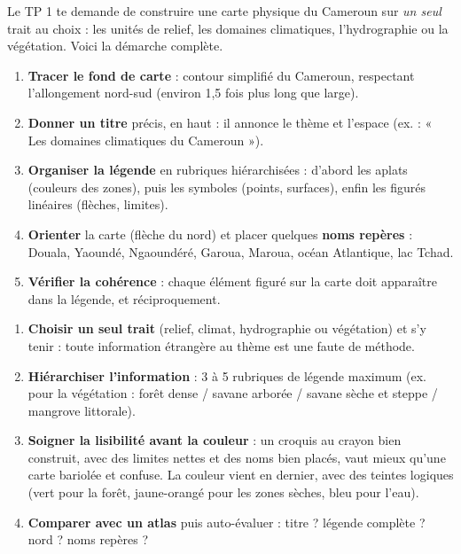 \documentclass[11pt]{article}
\newcommand{\cle}[1]{{\popxbold\color{popdark}#1}}
\begin{document}
Le TP 1 te demande de construire une carte physique du Cameroun sur \emph{un seul} trait au choix : les unités de relief, les domaines climatiques, l'hydrographie ou la végétation. Voici la démarche complète.

\begin{methode}
\begin{enumerate}
\item \textbf{Tracer le fond de carte} : contour simplifié du Cameroun, respectant l'allongement nord-sud (environ 1,5 fois plus long que large).
\item \textbf{Donner un titre} précis, en haut : il annonce le thème et l'espace (ex. : « Les domaines climatiques du Cameroun »).
\item \textbf{Organiser la légende} en rubriques hiérarchisées : d'abord les \cle{aplats} (couleurs des zones), puis les \cle{symboles} (points, surfaces), enfin les \cle{figurés} linéaires (flèches, limites).
\item \textbf{Orienter} la carte (flèche du nord) et placer quelques \textbf{noms repères} : Douala, Yaoundé, Ngaoundéré, Garoua, Maroua, océan Atlantique, lac Tchad.
\item \textbf{Vérifier la cohérence} : chaque élément figuré sur la carte doit apparaître dans la légende, et réciproquement.
\end{enumerate}
\end{methode}

\begin{methode}
\begin{enumerate}
\item \textbf{Choisir un seul trait} (relief, climat, hydrographie ou végétation) et s'y tenir : toute information étrangère au thème est une faute de méthode.
\item \textbf{Hiérarchiser l'information} : 3 à 5 rubriques de légende maximum (ex. pour la végétation : forêt dense / savane arborée / savane sèche et steppe / mangrove littorale).
\item \textbf{Soigner la lisibilité avant la couleur} : un croquis au crayon bien construit, avec des limites nettes et des noms bien placés, vaut mieux qu'une carte bariolée et confuse. La couleur vient en dernier, avec des teintes logiques (vert pour la forêt, jaune-orangé pour les zones sèches, bleu pour l'eau).
\item \textbf{Comparer avec un atlas} puis auto-évaluer : titre ? légende complète ? nord ? noms repères ?
\end{enumerate}
\end{methode}
\end{document}
